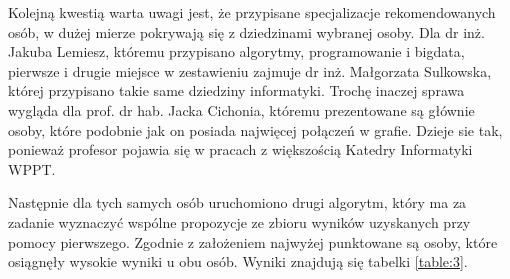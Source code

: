 Kolejną kwestią warta uwagi jest, że przypisane specjalizacje rekomendowanych osób, w dużej mierze pokrywają się z dziedzinami wybranej osoby. Dla dr inż. Jakuba Lemiesz, któremu przypisano algorytmy, programowanie i bigdata, pierwsze i drugie miejsce w zestawieniu zajmuje dr inż. Małgorzata Sulkowska, której przypisano takie same dziedziny informatyki. Trochę inaczej sprawa wygląda dla prof. dr hab. Jacka Cichonia, któremu prezentowane są głównie osoby, które podobnie jak on posiada najwięcej połączeń w grafie. Dzieje sie tak, ponieważ profesor pojawia się w pracach z większością Katedry Informatyki WPPT.

Następnie dla tych samych osób uruchomiono drugi algorytm, który ma za zadanie wyznaczyć wspólne propozycje ze zbioru wyników uzyskanych przy pomocy pierwszego. Zgodnie z założeniem najwyżej punktowane są osoby, które osiągnęły wysokie wyniki u obu osób. Wyniki znajdują się tabelki \ref{table:3}.


